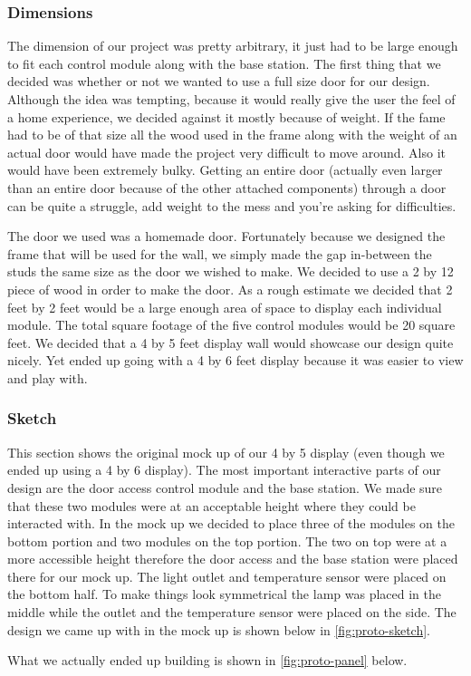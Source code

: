 \subsubsection{Dimensions} The dimension of our project was pretty arbitrary,
it just had to be large enough to fit each control module along with the
base station. The first thing that we decided was whether or not
we wanted to use a full size door for our design. Although the idea was
tempting, because it would really give the user the feel of a home experience,
we decided against it mostly because of weight. If the fame had to be of that
size all the wood used in the frame along with the weight of an actual door
would have made the project very difficult to move around. Also it would have been extremely bulky. Getting an entire door (actually even larger
than an entire door because of the other attached components) through a door
can be quite a struggle, add weight to the mess and you{}'re asking for
difficulties.

The door we used was a homemade door. Fortunately
because we designed the frame that will be used for the wall, we
simply made the gap in-between the studs the same size as the door we wished to
make. We decided to use a 2 by 12 piece of wood in order to make the door. As a rough estimate we decided that 2 feet by 2 feet would be a
large enough area of space to display each individual module. The total square footage of
the five control modules would be 20 square feet. We decided that a 4 by 5 feet
display wall would showcase our design quite nicely. Yet ended up going with a 4 by 6 feet display because it was easier to view and play with.

\subsubsection{Sketch} This section shows the original mock up of our 4 by 5 display (even though we ended up using a 4 by 6 display). The most important interactive parts of our design are the door access
control module and the base station. We made sure that these two modules
were at an acceptable height where they could be interacted with. In the mock up we decided to
place three of the modules on the bottom portion and two modules on the top
portion. The two on top were at a more accessible height therefore the door access
and the base station were placed there for our mock up. The light outlet and temperature
sensor were placed on the bottom half. To make things look symmetrical the
lamp was placed in the middle while the outlet and the temperature sensor
were placed on the side. The design we came up with in the mock up is shown below in  \autoref{fig:proto-sketch}.


What we actually ended up building is shown in \autoref{fig:proto-panel} below.

